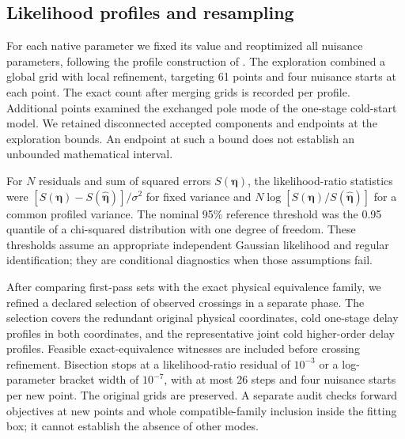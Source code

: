 \documentclass[11pt]{article}
\begin{document}
\subsection{Likelihood profiles and resampling}
For each native parameter we fixed its value and reoptimized all nuisance
parameters, following the profile construction of \citet{raue-2009-structural}.
The exploration combined a global grid with local refinement, targeting 61 points
and four nuisance starts at each point. The exact count after merging grids is
recorded per profile. Additional points examined the exchanged
pole mode of the one-stage cold-start model. We retained disconnected accepted
components and endpoints at the exploration bounds. An endpoint at such a bound
does not establish an unbounded mathematical interval.

For $N$ residuals and sum of squared errors $S(\bm\eta)$, the likelihood-ratio
statistics were $[S(\bm\eta)-S(\hat{\bm\eta})]/\sigma^2$ for fixed variance
and $N\log[S(\bm\eta)/S(\hat{\bm\eta})]$ for a common profiled variance.
The nominal 95\% reference threshold was the 0.95 quantile of a chi-squared
distribution with one degree of freedom. These thresholds assume an appropriate
independent Gaussian likelihood and regular identification; they are conditional
diagnostics when those assumptions fail.

After comparing first-pass sets with the exact physical equivalence family,
we refined a declared selection of observed crossings in a separate phase.
The selection covers the redundant original physical coordinates, cold
one-stage delay profiles in both coordinates, and the representative joint
cold higher-order delay profiles. Feasible exact-equivalence witnesses are
included before crossing refinement. Bisection stops at a likelihood-ratio
residual of $10^{-3}$ or a log-parameter bracket width of $10^{-7}$, with at
most 26 steps and four nuisance starts per new point. The original grids are
preserved. A separate audit checks forward objectives at new points and whole
compatible-family inclusion inside the fitting box; it cannot establish the
absence of other modes.
\end{document}
